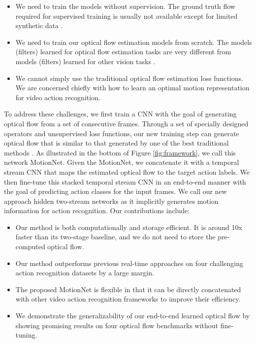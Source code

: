 \documentclass[runningheads]{llncs}
\begin{document}
		\begin{itemize}
			\item We need to train the models without supervision. The ground truth flow required for supervised training is usually not available except for limited synthetic data \cite{densenet_flow_icip17,dilate_flow_icip18,guided_flow_17}.  
			\item We need to train our optical flow estimation models from scratch. The models (filters) learned for optical flow estimation tasks are very different from models (filters) learned for other vision tasks \cite{Miao_2018_CVPR,xue2018deep,Miao_2018_AAAI}.
			\item We cannot simply use the traditional optical flow estimation loss functions. We are concerned chiefly with how to learn an optimal motion representation for video action recognition. 
		\end{itemize}
		
To address these challenges, we first train a CNN with the goal of generating optical flow from a set of consecutive frames. Through a set of specially designed operators and unsupervised loss functions, our new training step can generate optical flow that is similar to that generated by one of the best traditional methods \cite{TVL1realTime}. As illustrated in {\color{black}the bottom of} Figure \ref{fig:framework}, we call this network MotionNet. Given the MotionNet, we concatenate it with a temporal stream CNN that maps the estimated optical flow to the target action labels. We then fine-tune this stacked temporal stream CNN in an end-to-end manner with the goal of predicting action classes for the input frames. 
		We call our new approach hidden two-stream networks as it implicitly generates motion information for action recognition. Our contributions include: 
		\begin{itemize}
			\item Our method is both computationally and storage efficient. It is around 10x faster than its two-stage baseline, and we do not need to store the pre-computed optical flow.
			\item Our method outperforms previous real-time approaches on four challenging action recognition datasets by a large margin.
			\item The proposed MotionNet is flexible in that it can be directly concatenated with other video action recognition frameworks \cite{beyondshort2015,I3D_Carreira_cvpr17,spatiotemporal_du_cvpr2018,url_cvpr18} to improve their efficiency.
			\item We demonstrate the generalizability of our end-to-end learned optical flow by showing promising results on four optical flow benchmarks without fine-tuning.
		\end{itemize}
		
\end{document}
